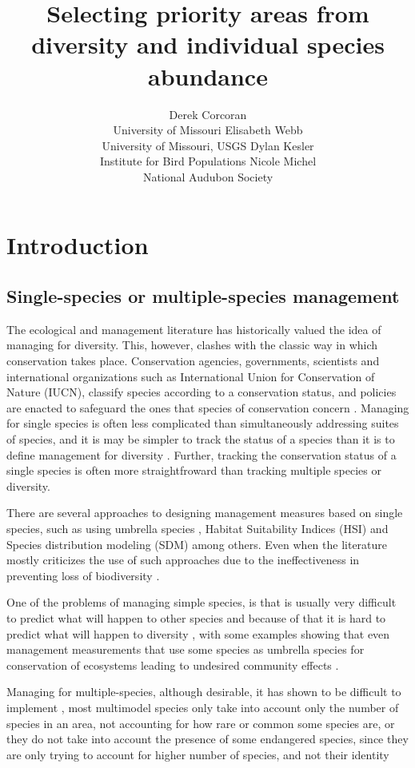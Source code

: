 \documentclass[article]{jss}
\author{
Derek Corcoran\\University of Missouri \And Elisabeth Webb\\University of Missouri, USGS \And Dylan Kesler\\Institute for Bird Populations \And Nicole Michel\\National Audubon Society
}
\title{Selecting priority areas from diversity and individual species abundance
\pkg{DiversityOccupancy}}
\begin{document}
\section{Introduction}\label{introduction}

\subsection{Single-species or multiple-species
management}\label{single-species-or-multiple-species-management}

The ecological and management literature has historically valued the
idea of managing for diversity. This, however, clashes with the classic
way in which conservation takes place. Conservation agencies,
governments, scientists and international organizations such as
International Union for Conservation of Nature (IUCN), classify species
according to a conservation status, and policies are enacted to
safeguard the ones that species of conservation concern
\citep{keller2004red, rodrigues2006value}. Managing for single species
is often less complicated than simultaneously addressing suites of
species, and it is may be simpler to track the status of a species than
it is to define management for diversity
\citep{simberloff1998flagships}. Further, tracking the conservation
status of a single species is often more straightfroward than tracking
multiple species or diversity.

There are several approaches to designing management measures based on
single species, such as using umbrella species
\citep{crosby2015looking, bichet2016maintaining}, Habitat Suitability
Indices (HSI)
\citep{reza2013integrating, soniat2013predicting, zohmann2013modelling}
and Species distribution modeling (SDM)
\citep{peterson2011ecological, guisan2013predicting} among others. Even
when the literature mostly criticizes the use of such approaches due to
the ineffectiveness in preventing loss of biodiversity
\citep{roberge2004usefulness, branton2011assessing}.

One of the problems of managing simple species, is that is usually very
difficult to predict what will happen to other species and because of
that it is hard to predict what will happen to diversity
\citep{pulliam2000relationship}, with some examples showing that even
management measurements that use some species as umbrella species for
conservation of ecosystems leading to undesired community effects
\citep{white2013conservation}.

Managing for multiple-species, although desirable, it has shown to be
difficult to implement
\citep{mollmann2014implementing, lmgren2015baltic}, most multimodel
species only take into account only the number of species in an area,
not accounting for how rare or common some species are, or they do not
take into account the presence of some endangered species, since they
are only trying to account for higher number of species, and not their
identity
\citep{taft2002waterbird, tori2002wetland, plaganyi2014multispecies}
\end{document}
